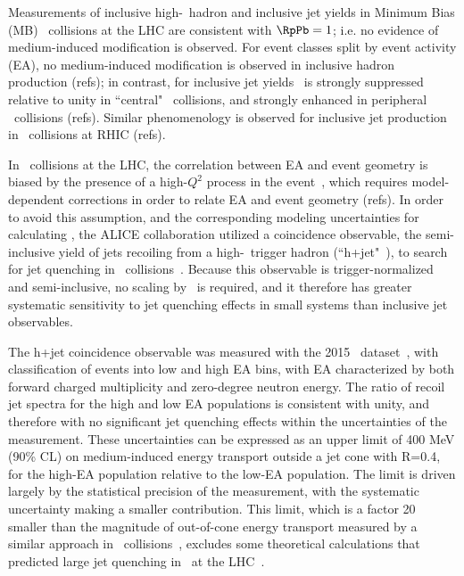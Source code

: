 \documentclass[../report.tex]{subfiles}
\begin{document}
Measurements of inclusive high-\pT\ hadron and inclusive jet yields in Minimum Bias (MB) \pPb\ collisions at the LHC are consistent with $\RpPb = 1$; i.e. no evidence of medium-induced modification is observed. For event classes split by event activity (EA), no medium-induced modification is observed in inclusive hadron production (refs); in contrast, for inclusive jet yields \RpPb\ is strongly suppressed relative to unity in ``central" \pPb\ collisions, and strongly enhanced in peripheral \pPb\ collisions (refs). Similar phenomenology is observed for inclusive jet production in \dAu\ collisions at RHIC (refs).

In \pPb\ collisions at the LHC, the correlation between EA and event geometry is biased by the presence of a high-$Q^2$ process in the event~\cite{Acharya:2017okq}, which requires model-dependent corrections in order to relate EA and event geometry (refs). In order to avoid this assumption, and the corresponding modeling uncertainties for calculating \TAA, the ALICE collaboration utilized a coincidence observable, the semi-inclusive yield of jets recoiling from a high-\pT\ trigger hadron (``h+jet"~\cite{Adam:2015doa}), to search for jet quenching in \pPb\ collisions~\cite{Acharya:2017okq}. Because this observable is trigger-normalized and semi-inclusive, no scaling by \TAA\ is required, and it therefore has greater systematic sensitivity to jet quenching effects in small systems than inclusive jet observables.

The h+jet coincidence observable was measured with the 2015 \pPb\ dataset~\cite{Acharya:2017okq}, with classification of events into low and high EA bins, with EA characterized by both forward charged multiplicity and zero-degree neutron energy. The ratio of recoil jet spectra for the high and low EA populations is consistent with unity, and therefore with no significant jet quenching effects within the uncertainties of the measurement. These uncertainties can be expressed as an upper limit of 400 MeV (90\% CL) on medium-induced energy transport outside a jet cone with R=0.4, for the high-EA population relative to the low-EA population. The limit is driven largely by the statistical precision of the measurement, with the systematic uncertainty making a smaller contribution. This limit, which is a factor 20 smaller than the magnitude of out-of-cone energy transport measured by a similar approach in \PbPb\ collisions~\cite{Adam:2015doa}, excludes some theoretical calculations that predicted large jet quenching in \pPb\ at the LHC~\cite{Acharya:2017okq}.
\end{document}
